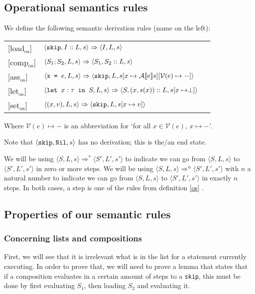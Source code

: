 \subsection{Operational semantics rules}
\begin{definition} 
\label{os}
We define the following semantic derivation rules (name on the left):

\begin{tabular}{p{5em}p{18em}p{13em}}
[load$_{\textrm{os}}$] &
\centering$\langle \texttt{skip}, I::L, s \rangle \Rightarrow \langle I, L, s \rangle$ & \medskip\\

[comp$_{\textrm{os}}$] &
\centering$\langle S_1; S_2, L, s \rangle \Rightarrow \langle S_1, S_2::L, s \rangle$ & \medskip\\

[ass$_{\textrm{os}}$] &
\centering $\langle \texttt{x = } e, L, s \rangle \Rightarrow \langle \texttt{skip}, L, s[x \mapsto \mathcal{A} \llbracket e \rrbracket s][\mathcal{V}(e)\mapsto-] \rangle$ & \medskip\\

[let$_{\textrm{os}}$] &
\centering $\langle \texttt{let }x : \tau \texttt{ in } S, L, s \rangle \Rightarrow \langle S, (x,s(x))::L, s[x\mapsto \perp] \rangle$ & \medskip\\

[set$_{\textrm{os}}$] &
\centering$\langle (x,v), L, s \rangle \Rightarrow \langle \texttt{skip}, L, s[x\mapsto v] \rangle$ & \medskip\\
\end{tabular} 
Where $\mathcal{V}(e)\mapsto-$ is an abbreviation for `for all $x \in \mathcal{V}(e)$, $x \mapsto -$'.
\end{definition} 
Note that $\langle \texttt{skip}, \texttt{Nil}, s \rangle$ has no derivation; this is the/an end state. 

We will be using $\langle S, L, s \rangle \Rightarrow ^{*} \langle S', L', s' \rangle$ to indicate we can go from $\langle S, L, s \rangle$ to $\langle S', L', s' \rangle$ in zero or more steps. We will be using $\langle S, L, s \rangle \Rightarrow ^{n} \langle S', L', s' \rangle$ with $n$ a natural number to indicate we can go from $\langle S, L, s \rangle$ to $\langle S', L', s' \rangle$ in exactly $n$ steps. In both cases, a step is one of the rules from definition \ref{os} .


\subsection{Properties of our semantic rules}

\subsubsection*{Concerning lists and compositions}
First, we will see that it is irrelevant what is in the list for a statement currently executing. In order to prove that, we will need to prove a lemma that states that if a composition evaluates in a certain amount of steps to a \texttt{skip}, this must be done by first evaluating $S_1$, then loading $S_2$ and evaluating it. 

